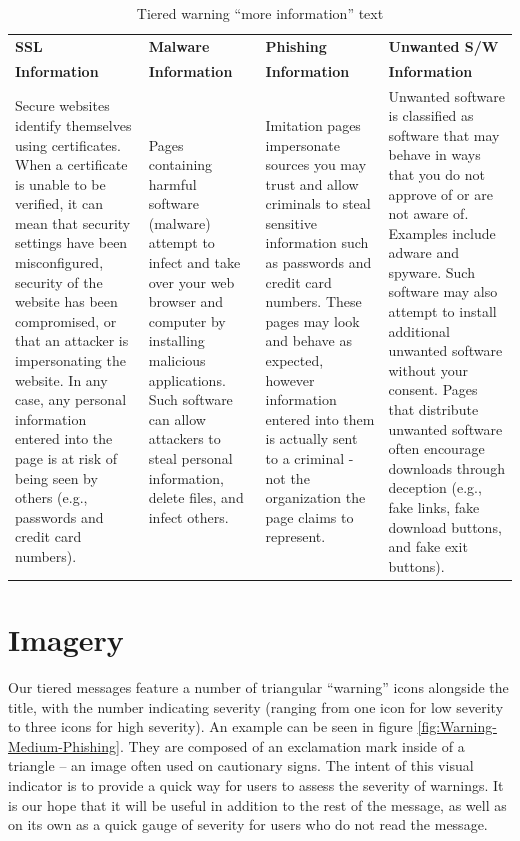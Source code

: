 {\renewcommand{\arraystretch}{1.2}
\begin{table}[!htb]
	\small
	\centering
	\begin{tabularx}{\textwidth}{|X|X|X|X|}
		\hline
		\textbf{SSL} & \textbf{Malware} & \textbf{Phishing} & \textbf{Unwanted S/W}\\
		\textbf{Information} & \textbf{Information} & \textbf{Information} & \textbf{Information}\\
		\hline
		Secure websites identify themselves using certificates. When a certificate is unable to be verified, it can mean that security settings have been misconfigured, security of the website has been compromised, or that an attacker is impersonating the website. In any case, any personal information entered into the page is at risk of being seen by others (e.g., passwords and credit card numbers).
		& Pages containing harmful software (malware) attempt to infect and take over your web browser and computer by installing malicious applications. Such software can allow attackers to steal personal information, delete files, and infect others.
		& Imitation pages impersonate sources you may trust and allow criminals to steal sensitive information such as passwords and credit card numbers. These pages may look and behave as expected, however information entered into them is actually sent to a criminal - not the organization the page claims to represent.
		& Unwanted software is classified as software that may behave in ways that you do not approve of or are not aware of. Examples include adware and spyware. Such software may also attempt to install additional unwanted software without your consent. Pages that distribute unwanted software often encourage downloads through deception (e.g., fake links, fake download buttons, and fake exit buttons).\\
		\hline
	\end{tabularx}
	\caption{Tiered warning ``more information'' text}
	\label{tab:Tiered-More-Info}
\end{table}}

\section{Imagery}
Our tiered messages feature a number of triangular ``warning'' icons alongside the title, with the number indicating severity (ranging from one icon for low severity to three icons for high severity). An example can be seen in figure \ref{fig:Warning-Medium-Phishing}. They are composed of an exclamation mark inside of a triangle -- an image often used on cautionary signs. The intent of this visual indicator is to provide a quick way for users to assess the severity of warnings. It is our hope that it will be useful in addition to the rest of the message, as well as on its own as a quick gauge of severity for users who do not read the message.
